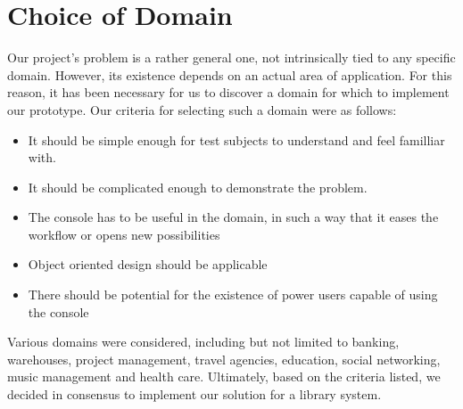 \section{Choice of Domain}
Our project's problem is a rather general one, not intrinsically tied to any specific domain. However, its existence depends on an actual area of application. For this reason, it has been necessary for us to discover a domain for which to implement our prototype. Our criteria for selecting such a domain were as follows:
\begin{itemize}
\item It should be simple enough for test subjects to understand and feel familliar with.
\item It should be complicated enough to demonstrate the problem.
\item The console has to be useful in the domain, in such a way that it eases the workflow or opens new possibilities
\item Object oriented design should be applicable
\item There should be potential for the existence of power users capable of using the console
\end{itemize}
Various domains were considered, including but not limited to banking, warehouses, project management, travel agencies, education, social networking, music management and health care. Ultimately, based on the criteria listed, we decided in consensus to implement our solution for a library system.

